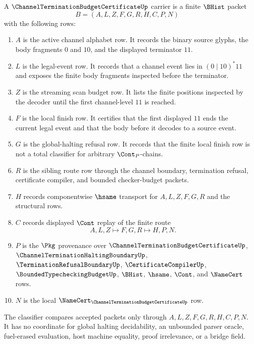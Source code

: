 \begin{definition}\label{def:channel-termination-budget-certificate-carrier}
A $\ChannelTerminationBudgetCertificateUp$ carrier is a finite $\BHist$ packet
$$
B=(A,L,Z,F,G,R,H,C,P,N)
$$
with the following rows:
\begin{enumerate}
\item $A$ is the active channel alphabet row. It records the binary source glyphs, the body fragments $0$ and $10$, and the displayed terminator $11$.
\item $L$ is the legal-event row. It records that a channel event lies in $(0\mid 10)^{*}11$ and exposes the finite body fragments inspected before the terminator.
\item $Z$ is the streaming scan budget row. It lists the finite positions inspected by the decoder until the first channel-level $11$ is reached.
\item $F$ is the local finish row. It certifies that the first displayed $11$ ends the current legal event and that the body before it decodes to a source event.
\item $G$ is the global-halting refusal row. It records that the finite local finish row is not a total classifier for arbitrary $\Cont_{P}$-chains.
\item $R$ is the sibling route row through the channel boundary, termination refusal, certificate compiler, and bounded checker-budget packets.
\item $H$ records componentwise $\hsame$ transport for $A,L,Z,F,G,R$ and the structural rows.
\item $C$ records displayed $\Cont$ replay of the finite route
$$
A,L,Z \longmapsto F,G,R \longmapsto H,P,N .
$$
\item $P$ is the $\Pkg$ provenance over $\ChannelTerminationBudgetCertificateUp$, $\ChannelTerminationHaltingBoundaryUp$, $\TerminationRefusalBoundaryUp$, $\CertificateCompilerUp$, $\BoundedTypecheckingBudgetUp$, $\BHist$, $\hsame$, $\Cont$, and $\NameCert$ rows.
\item $N$ is the local $\NameCert_{\ChannelTerminationBudgetCertificateUp}$ row.
\end{enumerate}
The classifier compares accepted packets only through $A,L,Z,F,G,R,H,C,P,N$. It has no coordinate for global halting decidability, an unbounded parser oracle, fuel-erased evaluation, host machine equality, proof irrelevance, or a bridge field.
\end{definition}

